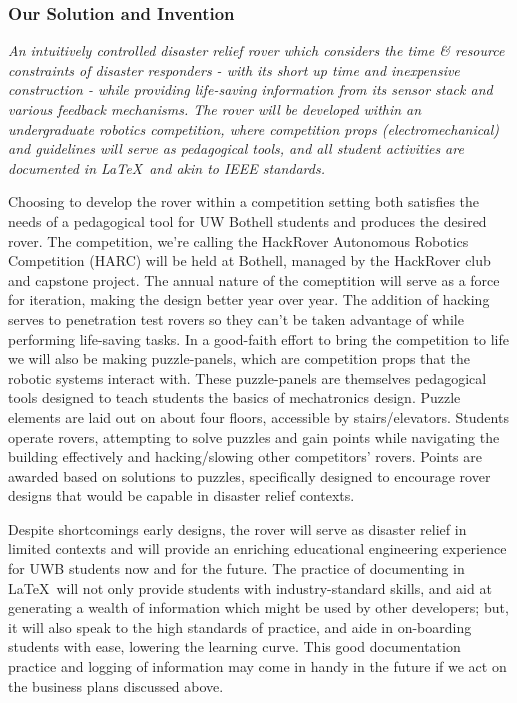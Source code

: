 \documentclass[a4paper, 10pt]{article}
\begin{document}
		\subsubsection*{Our Solution and Invention}
		\textit{An intuitively controlled disaster relief rover which considers the time \& resource constraints of disaster responders - with its short up time and inexpensive construction - while providing life-saving information from its sensor stack and various feedback mechanisms. The rover will be developed within an undergraduate robotics competition, where competition props (electromechanical) and guidelines will serve as pedagogical tools, and all student activities are documented in \LaTeX\ and akin to IEEE standards.}		
		
		Choosing to develop the rover within a competition setting both satisfies the needs of a pedagogical tool for UW Bothell students and produces the desired rover. The competition, we're calling the HackRover Autonomous Robotics Competition (HARC) will be held at Bothell, managed by the HackRover club and capstone project. The annual nature of the comeptition will serve as a force for iteration, making the design better year over year. The addition of hacking serves to penetration test rovers so they can't be taken advantage of while performing life-saving tasks. In a good-faith effort to bring the competition to life we will also be making puzzle-panels, which are competition props that the robotic systems interact with. These puzzle-panels are themselves pedagogical tools designed to teach students the basics of mechatronics design. Puzzle elements are laid out on about four floors, accessible by stairs/elevators. Students operate rovers, attempting to solve puzzles and gain points while navigating the building effectively and hacking/slowing other competitors' rovers. Points are awarded based on solutions to puzzles, specifically designed to encourage rover designs that would be capable in disaster relief contexts.

		Despite shortcomings early designs, the rover will serve as disaster relief in limited contexts and will provide an enriching educational engineering experience for UWB students now and for the future. The practice of documenting in \LaTeX\ will not only provide students with industry-standard skills, and aid at generating a wealth of information which might be used by other developers; but, it will also speak to the high standards of practice, and aide in on-boarding students with ease, lowering the learning curve. This good documentation practice and logging of information may come in handy in the future if we act on the business plans discussed above.
	
\end{document}
